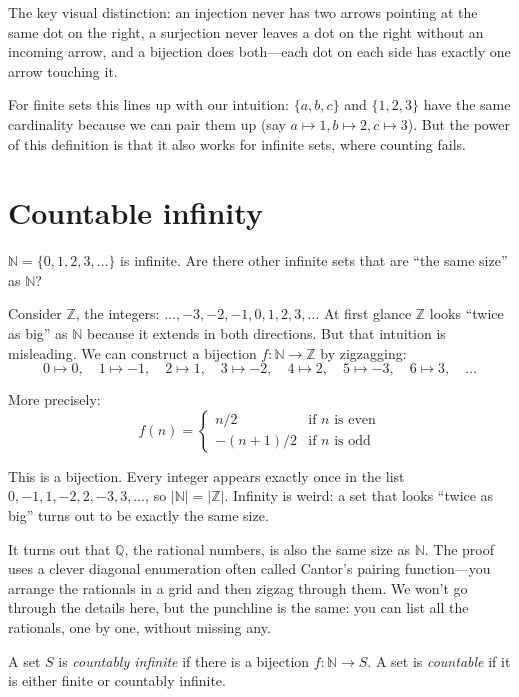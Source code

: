 \documentclass[11pt]{article}
\begin{document}
The key visual distinction: an injection never has two arrows pointing at the same dot on the right, a surjection never leaves a dot on the right without an incoming arrow, and a bijection does both---each dot on each side has exactly one arrow touching it.

For finite sets this lines up with our intuition: $\{a,b,c\}$ and $\{1,2,3\}$ have the same cardinality because we can pair them up (say $a \mapsto 1, b \mapsto 2, c \mapsto 3$). But the power of this definition is that it also works for infinite sets, where counting fails.

\section{Countable infinity}

$\mathbb{N} = \{0, 1, 2, 3, \ldots\}$ is infinite. Are there other infinite sets that are ``the same size'' as $\mathbb{N}$?

Consider $\mathbb{Z}$, the integers: $\ldots, -3, -2, -1, 0, 1, 2, 3, \ldots$ At first glance $\mathbb{Z}$ looks ``twice as big'' as $\mathbb{N}$ because it extends in both directions. But that intuition is misleading. We can construct a bijection $f : \mathbb{N} \to \mathbb{Z}$ by zigzagging:
\[
0 \mapsto 0, \quad 1 \mapsto -1, \quad 2 \mapsto 1, \quad 3 \mapsto -2, \quad 4 \mapsto 2, \quad 5 \mapsto -3, \quad 6 \mapsto 3, \quad \ldots
\]

More precisely:
\[
f(n) = \begin{cases} n/2 & \text{if } n \text{ is even} \\ -(n+1)/2 & \text{if } n \text{ is odd} \end{cases}
\]

This is a bijection. Every integer appears exactly once in the list $0, -1, 1, -2, 2, -3, 3, \ldots$, so $|\mathbb{N}| = |\mathbb{Z}|$. Infinity is weird: a set that looks ``twice as big'' turns out to be exactly the same size.

It turns out that $\mathbb{Q}$, the rational numbers, is also the same size as $\mathbb{N}$. The proof uses a clever diagonal enumeration often called Cantor's pairing function---you arrange the rationals in a grid and then zigzag through them. We won't go through the details here, but the punchline is the same: you can list all the rationals, one by one, without missing any.

\begin{definition}
A set $S$ is \emph{countably infinite} if there is a bijection $f : \mathbb{N} \to S$. A set is \emph{countable} if it is either finite or countably infinite.
\end{definition}
\end{document}
